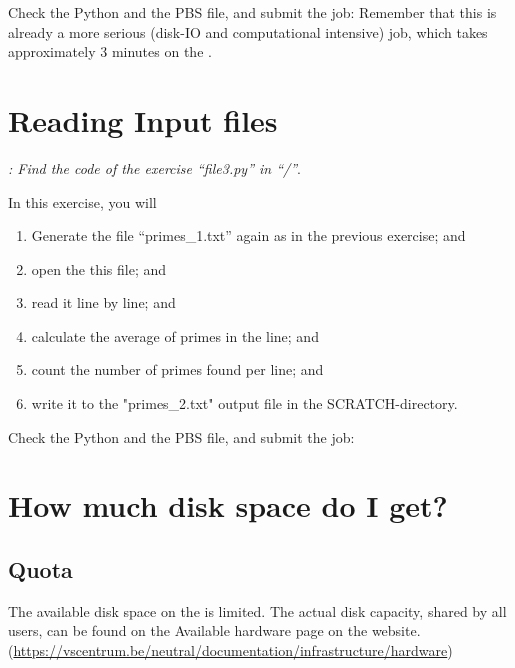 Check the Python and the PBS file, and submit the job: Remember that this is
already a more serious (disk-IO and computational intensive) job, which takes
approximately 3 minutes on the \hpc.

\begin{prompt}
\end{prompt}

\section{Reading Input files}

\textit{: Find the code of the exercise ``file3.py'' in
``\tilde/\exampledir''}.

In this exercise, you will
\begin{enumerate}
\item  Generate the file ``primes\_1.txt'' again as in the previous exercise; and
\item  open the this file; and
\item  read it line by line; and
\item  calculate the average of primes in the line; and
\item  count the number of primes found per line; and
\item  write it to the "primes\_2.txt" output file in the SCRATCH-directory.
\end{enumerate}

Check the Python and the PBS file, and submit the job:

\begin{prompt}
\end{prompt}

\section{How much disk space do I get?}

\subsection{Quota}

The available disk space on the \hpc is limited. The actual disk capacity,
shared by all users, can be found on the Available hardware page on the
website.
(\url{https://vscentrum.be/neutral/documentation/infrastructure/hardware})


